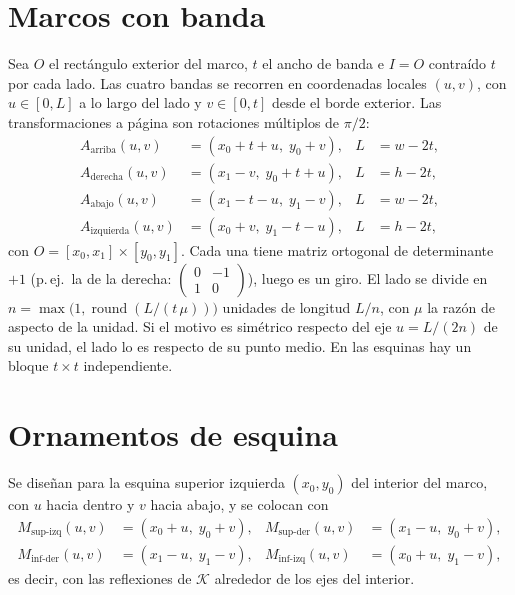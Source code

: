 \documentclass[11pt,a4paper]{article}
\theoremstyle{definition}
\theoremstyle{plain}
\theoremstyle{remark}
\newcommand{\Klein}{\mathcal{K}}
\begin{document}
\section{Marcos con banda}
Sea $O$ el rectángulo exterior del marco, $t$ el ancho de banda e
$I=O$ contraído $t$ por cada lado. Las cuatro bandas se recorren en coordenadas
locales $(u,v)$, con $u\in[0,L]$ a lo largo del lado y $v\in[0,t]$ desde el borde
exterior. Las transformaciones a página son rotaciones múltiplos de
$\pi/2$:
\begin{align*}
  A_\text{arriba}(u,v)&=(x_0+t+u,\;y_0+v), & L&=w-2t,\\
  A_\text{derecha}(u,v)&=(x_1-v,\;y_0+t+u), & L&=h-2t,\\
  A_\text{abajo}(u,v)&=(x_1-t-u,\;y_1-v), & L&=w-2t,\\
  A_\text{izquierda}(u,v)&=(x_0+v,\;y_1-t-u), & L&=h-2t,
\end{align*}
con $O=[x_0,x_1]\times[y_0,y_1]$. Cada una tiene matriz ortogonal de determinante
$+1$ (p.\,ej.\ la de la derecha: $\left(\begin{smallmatrix}0&-1\\1&0\end{smallmatrix}\right)$),
luego es un giro. El lado se divide en $n=\max\bigl(1,\operatorname{round}(L/(t\,\mu))\bigr)$
unidades de longitud $L/n$, con $\mu$ la razón de aspecto de la unidad. Si el motivo
es simétrico respecto del eje $u=L/(2n)$ de su unidad, el lado lo es respecto de su
punto medio. En las esquinas hay un bloque $t\times t$ independiente.

\section{Ornamentos de esquina}
Se diseñan para la esquina superior izquierda $(x_0,y_0)$ del interior del marco,
con $u$ hacia dentro y $v$ hacia abajo, y se colocan con
\begin{align*}
  M_\text{sup-izq}(u,v)&=(x_0+u,\;y_0+v), & M_\text{sup-der}(u,v)&=(x_1-u,\;y_0+v),\\
  M_\text{inf-der}(u,v)&=(x_1-u,\;y_1-v), & M_\text{inf-izq}(u,v)&=(x_0+u,\;y_1-v),
\end{align*}
es decir, con las reflexiones de $\Klein$ alrededor de los ejes del interior.
\end{document}
